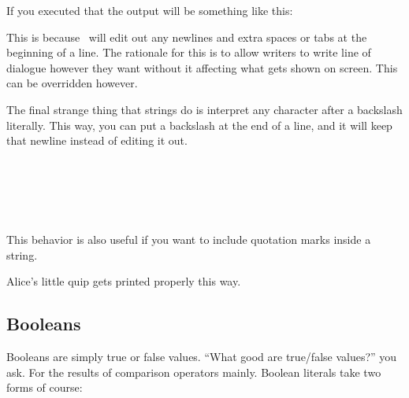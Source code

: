 If you executed that the output will be something like this:

\begin{SSCodeBox}
\end{SSCodeBox}

This is because \SSquared\ will edit out any newlines and extra spaces or tabs at the beginning of a line.  The rationale for this is to allow writers to write line of dialogue however they want without it affecting what gets shown on screen.  This can be overridden however.

The final strange thing that strings do is interpret any character after a backslash literally.  This way, you can put a backslash at the end of a line, and it will keep that newline instead of editing it out.

\begin{SSCodeBox}
\scitea{ } \\
 \\
 \\
 \\
\scitea{;}
\end{SSCodeBox}

\noindent{}This behavior is also useful if you want to include quotation marks inside a string.

\begin{SSCodeBox}
\end{SSCodeBox}

\noindent{}Alice's little quip gets printed properly this way.

\begin{SSCodeBox}
\end{SSCodeBox}


\subsection{Booleans}

Booleans are simply true or false values.  ``What good are true/false values?'' you ask.  For the results of comparison operators mainly.  Boolean literals take two forms of course:


